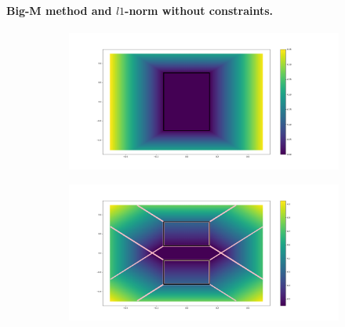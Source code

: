 \paragraph{Big-M method and $l1$-norm without constraints.}
\begin{figure}[ht]
    \centering
    \captionsetup[subfigure]{justification=centering}
    \begin{subfigure}[t]{0.48\linewidth}
    \includegraphics[trim={5cm 2cm 12cm 2cm},clip,width=\textwidth]{Figures/Chapter_MIP_SL1M/l1_no_cst/grad_simple_0.png}
    \end{subfigure}
    \begin{subfigure}[t]{0.48\linewidth}
    \includegraphics[trim={5cm 2cm 12cm 2cm},clip,width=\textwidth]{Figures/Chapter_MIP_SL1M/l1_no_cst/grad_two_0_1_limit.png}

\end{subfigure}
\end{figure}
